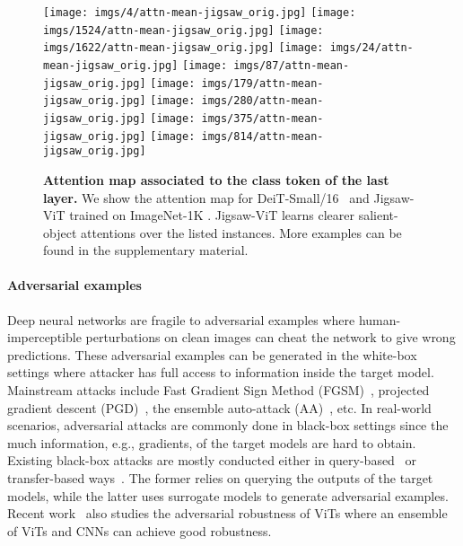 \documentclass{article}
\begin{document}
\begin{figure*}[t]
\begin{minipage}{0.9\textwidth}
		\centering
		\texttt{[image: imgs/4/attn-mean-jigsaw\_orig.jpg]}
		\texttt{[image: imgs/1524/attn-mean-jigsaw\_orig.jpg]}
		\texttt{[image: imgs/1622/attn-mean-jigsaw\_orig.jpg]}
		\texttt{[image: imgs/24/attn-mean-jigsaw\_orig.jpg]}
		\texttt{[image: imgs/87/attn-mean-jigsaw\_orig.jpg]}
		\texttt{[image: imgs/179/attn-mean-jigsaw\_orig.jpg]}
		\texttt{[image: imgs/280/attn-mean-jigsaw\_orig.jpg]}
		\texttt{[image: imgs/375/attn-mean-jigsaw\_orig.jpg]}
		\texttt{[image: imgs/814/attn-mean-jigsaw\_orig.jpg]}
		\end{minipage}
		\caption{{\bf Attention map associated to the class token of the last layer.} We show the attention map for DeiT-Small/16~\cite{touvron2021training} and Jigsaw-ViT trained on ImageNet{-1K} \cite{deng2009imagenet}. 
		Jigsaw-ViT learns clearer salient-object attentions over the listed instances.
		More examples can be found in the supplementary material.}
		\label{fig::attention}
	\end{figure*}
	
\paragraph{Adversarial examples}
Deep neural networks are fragile to adversarial examples \cite{dalvi2004adversarial} where human-imperceptible perturbations on clean images can cheat the network to give wrong predictions. 
These adversarial examples can be generated in the white-box settings where attacker has full access to information inside
the target model.
Mainstream attacks include Fast Gradient Sign Method (FGSM)~\cite{goodfellow2014explaining}, projected gradient descent (PGD)~\cite{madry2018towards}, the ensemble auto-attack (AA)~\cite{croce2020reliable}, etc.
In real-world scenarios, adversarial attacks are commonly done in black-box settings since the much information, e.g., gradients, of the target models are hard to obtain.
Existing black-box attacks are mostly conducted either in query-based~\cite{yang2020learning} or transfer-based ways~\cite{papernot2017practical}.
The former relies on querying the outputs of the target models, while the latter uses surrogate models to generate adversarial examples.
Recent work~\cite{mahmood2021robustness} also studies the adversarial robustness of ViTs where an ensemble of ViTs and CNNs can achieve good robustness.
\end{document}
